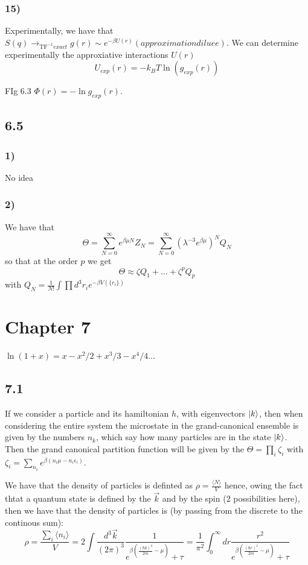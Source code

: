 \documentclass[10pt,a4paper]{book}
\newcommand{\tf}{\text{TF}}
\begin{document}
\subsection*{15)}

Experimentally, we have that $S(q)\to_{\tf^{-1}exact }g(r)\sim e^{-\beta U(r)}(approximation diluee)$. We can determine experimentally the approxiative interactions $U(r)$
$$U_{exp}(r)=-k_BT\ln(g_{exp}(r))$$

FIg 6.3 $\Phi(r)=-\ln g_{exp}(r)$. 


\section*{6.5}

\subsection*{1)}
No idea

\subsection*{2)}

We have that
$$\Theta=\sum_{N=0}^{\infty}e^{\beta \mu N}Z_N=\sum_{N=0}^{\infty}(\lambda^{-3}e^{\beta\mu})^NQ_N$$
so that at the order $p$ we get
$$\Theta\approx \zeta Q_1+\ldots+\zeta^{p}Q_p$$
with $Q_N=\frac{1}{N!}\int\prod d^3{r}_i e^{-\beta V(\{r_i\})}$


\chapter*{Chapter 7}
$\ln(1+x)=x-x^2/2+x^3/3-x^4/4...$
\section*{7.1}
If we consider a particle and its hamiltonian $h$, with eigenvectors $\ket{k}$, then when considering the entire system the microstate in the grand-canonical ensemble is given by the numbers $n_k$, which say how many particles are in the state $\ket{k}$. Then the grand canonical partition function will be given by the $\Theta=\prod_i\zeta_i$ with $\zeta_i=\sum_{n_i} e^{\beta(n_i\mu-n_i\epsilon_i)}$.



We have that the density of particles is definted as $\rho=\frac{\langle N\rangle}{V}$
hence, owing the fact thtat a quantum state is defined by the $\vec{k}$ and by the spin (2 possibilities here), then we have that the density of particles is (by passing from the discrete to the continous sum):
$$\rho=\frac{\sum_i\langle n_i\rangle}{V}=2\int\frac{d^3\vec{k}}{(2\pi)^3}\frac{1}{e^{\beta(\frac{(\hbar k)^2}{2m}-\mu)}+\tau}=\frac{1}{\pi^2}\int_0^{\infty} dr\frac{r^2}{e^{\beta(\frac{(\hbar r)^2}{2m}-\mu)}+\tau}$$
\end{document}
